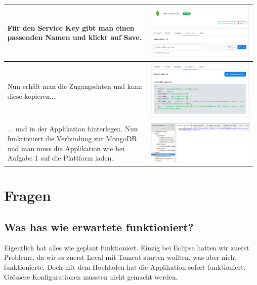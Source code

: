 \begin{longtable}{| p{5cm} | p{11cm} |}
 \\ \hline
Für den Service Key gibt man einen passenden Namen und klickt auf Save.
&\includegraphics[width=0.65\columnwidth, valign=T]{images/mongodbexample/image4.png}
 \\ \hline
Nun erhält man die Zugangsdaten und kann diese kopieren...
&\includegraphics[width=0.65\columnwidth, valign=T]{images/mongodbexample/image5.png}
 \\ \hline
... und in der Applikation hinterlegen. Nun funktioniert die Verbindung zur MongoDB und man muss die Applikation wie bei Aufgabe 1 auf die Plattform laden.&\includegraphics[width=0.65\columnwidth, valign=T]{images/mongodbexample/image6.png}
 \\ \hline
\end{longtable}

\section{Fragen}
\subsection{Was has wie erwartete funktioniert?}
Eigentlich hat alles wie geplant funktioniert. Einzig bei Eclipse hatten wir zuerst Probleme, da wir es zuerst Local mit Tomcat starten wollten, was aber nicht funktionierte. Doch mit dem Hochladen hat die Applikation sofort funktioniert. Grössere Konfigurationen mussten nicht gemacht werden.
